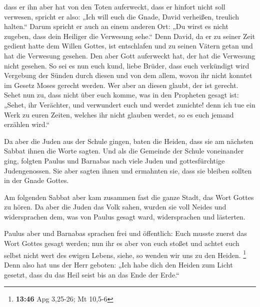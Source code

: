  dass er ihn aber hat von den Toten auferweckt, dass er
hinfort nicht soll verwesen, spricht er also: „Ich will euch die Gnade,
David verheißen, treulich halten.``  Darum spricht er auch
an einem anderen Ort: „Du wirst es nicht zugeben, dass dein Heiliger die
Verwesung sehe.``  Denn David, da er zu seiner Zeit gedient
hatte dem Willen Gottes, ist entschlafen und zu seinen Vätern getan und
hat die Verwesung gesehen.  Den aber Gott auferweckt hat,
der hat die Verwesung nicht gesehen.  So sei es nun euch
kund, liebe Brüder, dass euch verkündigt wird Vergebung der Sünden durch
diesen und von dem allem, wovon ihr nicht konntet im Gesetz Moses
gerecht werden.  Wer aber an diesen glaubt, der ist
gerecht.  Sehet nun zu, dass nicht über euch komme, was in
den Propheten gesagt ist:  „Sehet, ihr Verächter, und
verwundert euch und werdet zunichte! denn ich tue ein Werk zu euren
Zeiten, welches ihr nicht glauben werdet, so es euch jemand erzählen
wird.``

 Da aber die Juden aus der Schule gingen, baten die Heiden,
dass sie am nächsten Sabbat ihnen die Worte sagten.  Und
als die Gemeinde der Schule voneinander ging, folgten Paulus und
Barnabas nach viele Juden und gottesfürchtige Judengenossen. Sie aber
sagten ihnen und ermahnten sie, dass sie bleiben sollten in der Gnade
Gottes.

 Am folgenden Sabbat aber kam zusammen fast die ganze
Stadt, das Wort Gottes zu hören.  Da aber die Juden das
Volk sahen, wurden sie voll Neides und widersprachen dem, was von Paulus
gesagt ward, widersprachen und lästerten.

 Paulus aber und Barnabas sprachen frei und öffentlich:
Euch musste zuerst das Wort Gottes gesagt werden; nun ihr es aber von
euch stoßet und achtet euch selbst nicht wert des ewigen Lebens, siehe,
so wenden wir uns zu den Heiden. \footnote{\textbf{13:46} Apg 3,25-26;
  Mt 10,5-6}  Denn also hat uns der Herr geboten: „Ich habe
dich den Heiden zum Licht gesetzt, dass du das Heil seist bis an das
Ende der Erde.``

